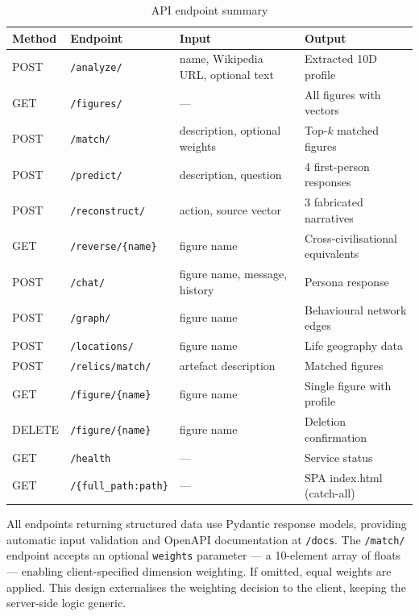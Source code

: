 \documentclass[11pt, a4paper]{report}
\begin{document}
\begin{table}[H]
  \centering
  \caption{API endpoint summary}
  \label{tab:api}
  \begin{tabular}{llp{3.5cm}p{4cm}}
    \toprule
    Method & Endpoint & Input & Output \\
    \midrule
    POST & \texttt{/analyze/} & name, Wikipedia URL, optional text & Extracted 10D profile \\
    GET & \texttt{/figures/} & — & All figures with vectors \\
    POST & \texttt{/match/} & description, optional weights & Top-$k$ matched figures \\
    POST & \texttt{/predict/} & description, question & 4 first-person responses \\
    POST & \texttt{/reconstruct/} & action, source vector & 3 fabricated narratives \\
    GET & \texttt{/reverse/\{name\}} & figure name & Cross-civilisational equivalents \\
    POST & \texttt{/chat/} & figure name, message, history & Persona response \\
    POST & \texttt{/graph/} & figure name & Behavioural network edges \\
    POST & \texttt{/locations/} & figure name & Life geography data \\
    POST & \texttt{/relics/match/} & artefact description & Matched figures \\
    GET & \texttt{/figure/\{name\}} & figure name & Single figure with profile \\
    DELETE & \texttt{/figure/\{name\}} & figure name & Deletion confirmation \\
    GET & \texttt{/health} & — & Service status \\
    GET & \texttt{/\{full\_path:path\}} & — & SPA index.html (catch-all) \\
    \bottomrule
  \end{tabular}
\end{table}

All endpoints returning structured data use Pydantic response models, providing automatic input validation and OpenAPI documentation at \texttt{/docs}. The \texttt{/match/} endpoint accepts an optional \texttt{weights} parameter — a 10-element array of floats — enabling client-specified dimension weighting. If omitted, equal weights are applied. This design externalises the weighting decision to the client, keeping the server-side logic generic.
\end{document}
